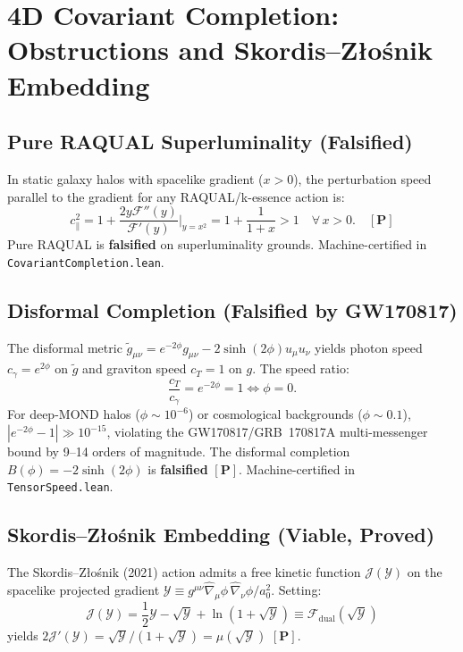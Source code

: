 \documentclass[aps,prd,preprint,superscriptaddress,nofootinbib,amsmath,amssymb,floatfix]{revtex4-2}
\begin{document}
\section{4D Covariant Completion: Obstructions and Skordis--Z\l{}o\'snik Embedding}
\label{sec:covariant}

\subsection{Pure RAQUAL Superluminality (Falsified)}

In static galaxy halos with spacelike gradient ($x > 0$), the perturbation speed parallel to the gradient for any RAQUAL/k-essence action is:
\begin{equation}
c_\parallel^2 = 1 + \frac{2y\mathcal{F}''(y)}{\mathcal{F}'(y)}\bigg|_{y=x^2} = 1 + \frac{1}{1+x} > 1 \quad \forall\, x > 0. \quad \mathbf{[P]}
\end{equation}
Pure RAQUAL is \textbf{falsified} on superluminality grounds. Machine-certified in \texttt{CovariantCompletion.lean}.

\subsection{Disformal Completion (Falsified by GW170817)}

The disformal metric $\tilde{g}_{\mu\nu} = e^{-2\phi}g_{\mu\nu} - 2\sinh(2\phi)u_\mu u_\nu$ yields photon speed $c_\gamma = e^{2\phi}$ on $\tilde{g}$ and graviton speed $c_T = 1$ on $g$. The speed ratio:
\begin{equation}
\frac{c_T}{c_\gamma} = e^{-2\phi} = 1 \iff \phi = 0.
\end{equation}
For deep-MOND halos ($\phi \sim 10^{-6}$) or cosmological backgrounds ($\phi \sim 0.1$), $|e^{-2\phi} - 1| \gg 10^{-15}$, violating the GW170817/GRB~170817A multi-messenger bound by 9--14 orders of magnitude. The disformal completion $B(\phi) = -2\sinh(2\phi)$ is \textbf{falsified} $\mathbf{[P]}$. Machine-certified in \texttt{TensorSpeed.lean}.

\subsection{Skordis--Z\l{}o\'snik Embedding (Viable, Proved)}

The Skordis--Z\l{}o\'snik (2021) \cite{SkordisZlosnik2021} action admits a free kinetic function $\mathcal{J}(\mathcal{Y})$ on the spacelike projected gradient $\mathcal{Y} \equiv g^{\mu\nu}\hat\nabla_\mu\phi\,\hat\nabla_\nu\phi/a_0^2$. Setting:
\begin{equation}
\mathcal{J}(\mathcal{Y}) = \frac{1}{2}\mathcal{Y} - \sqrt{\mathcal{Y}} + \ln(1+\sqrt{\mathcal{Y}}) \equiv \mathcal{F}_{\text{dual}}(\sqrt{\mathcal{Y}})
\end{equation}
yields $2\mathcal{J}'(\mathcal{Y}) = \sqrt{\mathcal{Y}}/(1+\sqrt{\mathcal{Y}}) = \mu(\sqrt{\mathcal{Y}})$ $\mathbf{[P]}$.
\end{document}
